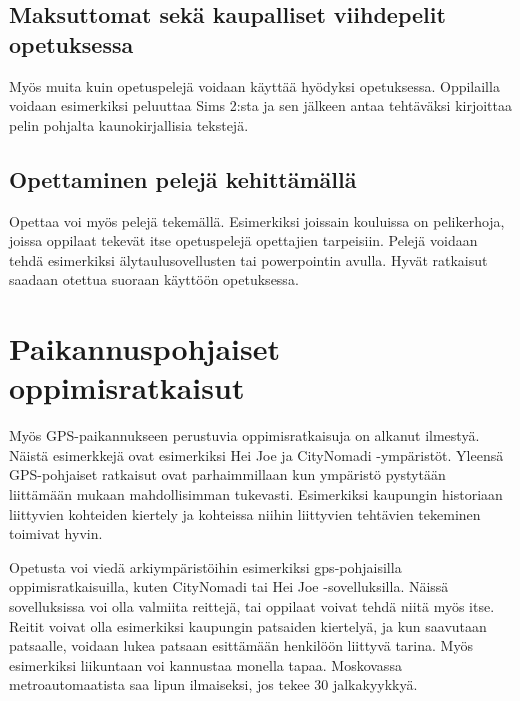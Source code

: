 \documentclass[utf8,bachelor]{gradu3}
\begin{document}
\subsection{Maksuttomat sekä kaupalliset viihdepelit opetuksessa}
Myös muita kuin opetuspelejä voidaan käyttää hyödyksi opetuksessa. Oppilailla voidaan esimerkiksi peluuttaa Sims 2:sta ja sen jälkeen antaa tehtäväksi kirjoittaa pelin pohjalta kaunokirjallisia tekstejä.

\subsection{Opettaminen pelejä kehittämällä}
Opettaa voi myös pelejä tekemällä. Esimerkiksi joissain kouluissa on pelikerhoja, joissa oppilaat tekevät itse opetuspelejä opettajien tarpeisiin. Pelejä voidaan tehdä esimerkiksi älytaulusovellusten tai powerpointin avulla. Hyvät ratkaisut saadaan otettua suoraan käyttöön opetuksessa. \parencite[][]{peleja}


\section{Paikannuspohjaiset oppimisratkaisut}
Myös GPS-paikannukseen perustuvia oppimisratkaisuja on alkanut ilmestyä. Näistä esimerkkejä ovat esimerkiksi Hei Joe ja CityNomadi -ympäristöt. Yleensä GPS-pohjaiset ratkaisut ovat parhaimmillaan kun ympäristö pystytään liittämään mukaan mahdollisimman tukevasti. Esimerkiksi kaupungin historiaan liittyvien kohteiden kiertely ja kohteissa niihin liittyvien tehtävien tekeminen toimivat hyvin.

Opetusta voi viedä arkiympäristöihin esimerkiksi gps-pohjaisilla oppimisratkaisuilla, kuten CityNomadi tai Hei Joe -sovelluksilla. Näissä sovelluksissa voi olla valmiita reittejä, tai oppilaat voivat tehdä niitä myös itse. Reitit voivat olla esimerkiksi kaupungin patsaiden kiertelyä, ja kun saavutaan patsaalle, voidaan lukea patsaan esittämään henkilöön liittyvä tarina. Myös esimerkiksi liikuntaan voi kannustaa monella tapaa. Moskovassa metroautomaatista saa lipun ilmaiseksi, jos tekee 30 jalkakyykkyä.

\end{document}
